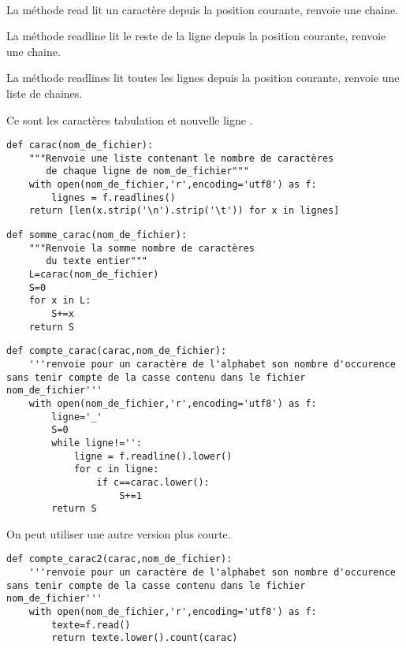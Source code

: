 \setcounter{numques}{0}~\\

\question{} 

La méthode read lit un caractère depuis la position courante, renvoie une chaine.

La méthode readline lit le reste de la ligne depuis la position courante, renvoie une chaine.

La méthode readlines lit toutes les lignes depuis la position courante, renvoie une liste de chaines.

\question{} 


Ce sont les caractères \og tabulation\fg{} et \og nouvelle ligne\fg{} .


\question{}

\begin{lstlisting}
def carac(nom_de_fichier):
    """Renvoie une liste contenant le nombre de caractères
       de chaque ligne de nom_de_fichier"""
    with open(nom_de_fichier,'r',encoding='utf8') as f:
        lignes = f.readlines()
    return [len(x.strip('\n').strip('\t')) for x in lignes]
\end{lstlisting}


\question{}

\begin{lstlisting}
def somme_carac(nom_de_fichier):
    """Renvoie la somme nombre de caractères
       du texte entier"""
    L=carac(nom_de_fichier)
    S=0
    for x in L:
        S+=x
    return S
\end{lstlisting}

\question{}
\begin{lstlisting}
def compte_carac(carac,nom_de_fichier):
    '''renvoie pour un caractère de l'alphabet son nombre d'occurence sans tenir compte de la casse contenu dans le fichier nom_de_fichier'''
    with open(nom_de_fichier,'r',encoding='utf8') as f:
        ligne='_'
        S=0
        while ligne!='':
            ligne = f.readline().lower()
            for c in ligne:
                if c==carac.lower():
                    S+=1
        return S
\end{lstlisting}

On peut utiliser une autre version plus courte.

\begin{lstlisting}
def compte_carac2(carac,nom_de_fichier):
    '''renvoie pour un caractère de l'alphabet son nombre d'occurence sans tenir compte de la casse contenu dans le fichier nom_de_fichier'''
    with open(nom_de_fichier,'r',encoding='utf8') as f:
        texte=f.read()
        return texte.lower().count(carac)
\end{lstlisting}


